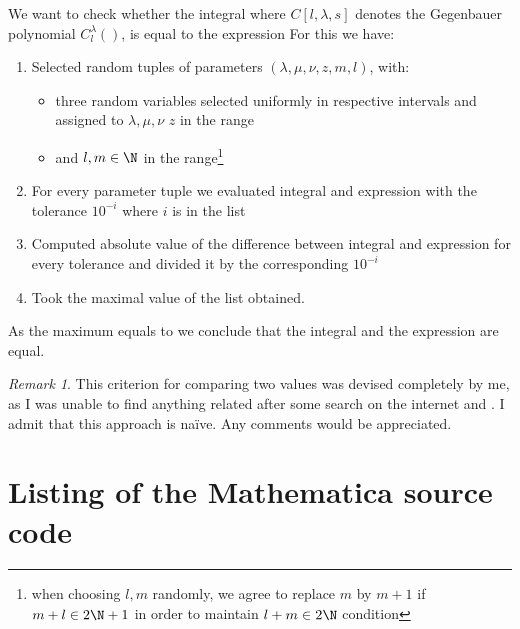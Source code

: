 \documentclass[a4paper]{article}
\theoremstyle{remark}
\newtheorem{remark}{Remark}
\begin{document}
We want to check whether the integral
where $C[l,\lambda,s]$ denotes the Gegenbauer polynomial $C^\lambda_l()$,
is equal to the expression
For this we have:
\begin{enumerate}
	\item 
Selected 
random tuples of parameters $(\lambda,\mu,\nu,z,m,l)$, with:\begin{itemize}
	\item 
		three random variables selected uniformly in respective intervals
		and assigned to $\lambda,\mu,\nu$
$z$ in the range
	\item
and $l,m\in\N$ in the range\footnote{when choosing $l,m$ randomly, we agree to replace $m$ by $m+1$ if $m+l\in2\N+1$ in order to maintain $l+m\in2\N$ condition}

\end{itemize}
\item For every parameter tuple we evaluated integral and expression with the tolerance $10^{-i}$ where $i$ is in the list
\item Computed absolute value of the difference between integral and expression for every tolerance and divided it by the corresponding $10^{-i}$
\item Took the maximal value of the list obtained.
\end{enumerate}
As the maximum equals to
we conclude that the integral and the expression are equal.
\begin{remark}
	This criterion for comparing two values was devised completely by me, as I was unable to find anything related after some search on the internet and \cite{teukolsky1992numerical}.
	I admit that this approach is na\"ive. Any comments would be appreciated.
\end{remark}
	\appendix
	\section{Listing of the Mathematica source code}
	
	
	
\end{document}
